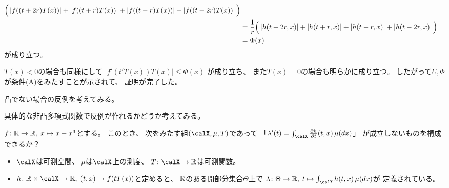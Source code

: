\documentclass[report]{jlreq}
\begin{document}
\begin{answer}
\begin{alignat}{1}
                \Big(
                    \left|{
                        f((t + 2r)T(x))
                    }\right|
                    +
                    \left|{
                        f((t + r)T(x))
                    }\right|
                    +
                    \left|{
                        f((t - r)T(x))
                    }\right|
                    +
                    \left|{
                        f((t - 2r)T(x))
                    }\right|
                \Big)
                \\
            &=
                \frac{1}{r}
                \Big(
                    \left|{
                        h(t + 2r, x)
                    }\right|
                    +
                    \left|{
                        h(t + r, x)
                    }\right|
                    +
                    \left|{
                        h(t - r, x)
                    }\right|
                    +
                    \left|{
                        h(t - 2r, x)
                    }\right|
                \Big)
                \\
            &=
                \Phi(x)
    \end{alignat}
    が成り立つ。

    $T(x) < 0$の場合も同様にして
    $|f'(t'T(x)) T(x)| \le \Phi(x)$
    が成り立ち、
    また$T(x) = 0$の場合も明らかに成り立つ。
    したがって$U, \Phi$が条件(A)をみたすことが示されて、
    証明が完了した。
\end{answer}

凸でない場合の反例を考えてみる。

\begin{problem}
\end{problem}

\begin{answer}
    \TODO{}
\end{answer}

具体的な非凸多項式関数で反例が作れるかどうか考えてみる。

\begin{problem}
    $f \colon \mathbb{R} \to \mathbb{R}, \; x \mapsto x - x^3$とする。
    このとき、
    次をみたす組$(\calX, \mu, T)$であって
    「$\lambda'(t) = \int_\calX \deldel[h]{t}(t, x) \, \mu(dx)$」
    が成立しないものを構成できるか？
    \begin{itemize}
        \item $\calX$は可測空間、
            $\mu$は$\calX$上の測度、
            $T \colon \calX \to \R$は可測関数。
        \item $h \colon \R \times \calX \to \R, \; (t, x) \mapsto f(tT(x))$と定めると、
            $\mathbb{R}$のある開部分集合$\Theta$上で
            $\lambda \colon \Theta \to \R, \; t \mapsto \int_\calX h(t, x) \, \mu(dx)$が
            定義されている。
    \end{itemize}
\end{problem}
\end{document}
